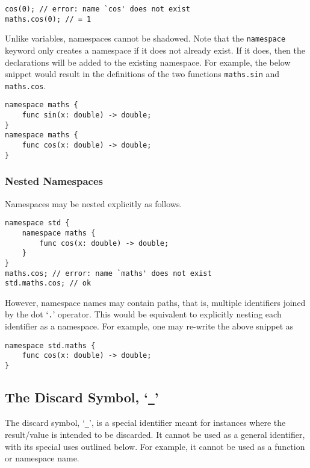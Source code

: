\begin{lstlisting}[language=CustomLang]
cos(0); // error: name `cos' does not exist
maths.cos(0); // = 1
\end{lstlisting}

Unlike variables, namespaces cannot be shadowed.
Note that the \texttt{namespace} keyword only creates a namespace if it does not already exist.
If it does, then the declarations will be added to the existing namespace.
For example, the below snippet would result in the definitions of the two functions \texttt{maths.sin} and \texttt{maths.cos}.

\begin{lstlisting}[language=CustomLang]
namespace maths {
    func sin(x: double) -> double;
}
namespace maths {
    func cos(x: double) -> double;
}
\end{lstlisting}

\subsubsection{Nested Namespaces}

Namespaces may be nested explicitly as follows.

\begin{lstlisting}[language=CustomLang]
namespace std {
    namespace maths {
        func cos(x: double) -> double;
    }
}
maths.cos; // error: name `maths' does not exist
std.maths.cos; // ok
\end{lstlisting}

However, namespace names may contain paths, that is, multiple identifiers joined by the dot `\texttt{.}' operator.
This would be equivalent to explicitly nesting each identifier as a namespace.
For example, one may re-write the above snippet as

\begin{lstlisting}[language=CustomLang]
namespace std.maths {
    func cos(x: double) -> double;
}
\end{lstlisting}

\subsection{The Discard Symbol, `\texttt{\_}'}

The discard symbol, `\texttt{\_}', is a special identifier meant for instances where the result/value is intended to be discarded.
It cannot be used as a general identifier, with its special uses outlined below.
For example, it cannot be used as a function or namespace name.

